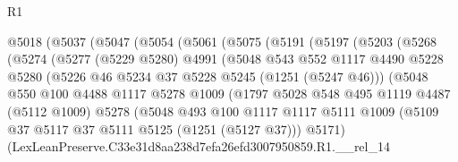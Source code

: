 \begin{lexlean}{R1}
\begin{coremodule}
                @5018
                  (@5037
                    (@5047
                      (@5054
                        (@5061
                          (@5075
                            (@5191
                              (@5197
                                (@5203
                                  (@5268
                                    (@5274
                                      (@5277
                                        (@5229 @5280)
                                        @4991
                                        (@5048
                                          @543
                                          @552
                                          @1117
                                          @4490
                                          @5228
                                          @5280
                                          (@5226 @46 @5234 @37 @5228 @5245 (@1251 (@5247 @46)))
                                          (@5048
                                            @550
                                            @100
                                            @4488
                                            @1117
                                            @5278
                                            @1009
                                            (@1797
                                              @5028
                                              @548
                                              @495
                                              @1119
                                              @4487
                                              (@5112 @1009)
                                              @5278
                                              (@5048
                                                @493
                                                @100
                                                @1117
                                                @1117
                                                @5111
                                                @1009
                                                (@5109
                                                  @37
                                                  @5117
                                                  @37
                                                  @5111
                                                  @5125
                                                  (@1251 (@5127 @37)))
                                                @5171)
                                              (LexLeanPreserve.C33e31d8aa238d7efa26efd3007950859.R1.__rel_14

\end{coremodule}
\end{lexlean}
